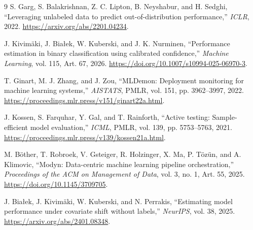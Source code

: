 \begin{thebibliography}{9}
S. Garg, S. Balakrishnan, Z. C. Lipton, B. Neyshabur, and H. Sedghi,
“Leveraging unlabeled data to predict out-of-distribution performance,”
\emph{ICLR}, 2022.
\url{https://arxiv.org/abs/2201.04234}.

J. Kivimäki, J. Białek, W. Kuberski, and J. K. Nurminen,
“Performance estimation in binary classification using calibrated confidence,”
\emph{Machine Learning}, vol. 115, Art. 67, 2026.
\url{https://doi.org/10.1007/s10994-025-06970-3}.

T. Ginart, M. J. Zhang, and J. Zou,
“MLDemon: Deployment monitoring for machine learning systems,”
\emph{AISTATS}, PMLR, vol. 151, pp. 3962--3997, 2022.
\url{https://proceedings.mlr.press/v151/ginart22a.html}.

J. Kossen, S. Farquhar, Y. Gal, and T. Rainforth,
“Active testing: Sample-efficient model evaluation,”
\emph{ICML}, PMLR, vol. 139, pp. 5753--5763, 2021.
\url{https://proceedings.mlr.press/v139/kossen21a.html}.

M. Böther, T. Robroek, V. Gsteiger, R. Holzinger, X. Ma, P. Tözün, and A. Klimovic,
“Modyn: Data-centric machine learning pipeline orchestration,”
\emph{Proceedings of the ACM on Management of Data}, vol. 3, no. 1, Art. 55, 2025.
\url{https://doi.org/10.1145/3709705}.

J. Białek, J. Kivimäki, W. Kuberski, and N. Perrakis,
“Estimating model performance under covariate shift without labels,”
\emph{NeurIPS}, vol. 38, 2025.
\url{https://arxiv.org/abs/2401.08348}.
\end{thebibliography}
